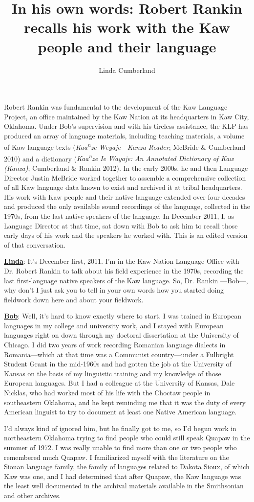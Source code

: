 \documentclass[output=paper]{LSP/langsci}
\author{Linda Cumberland}
\title{In his own words: Robert Rankin recalls his work with the Kaw people and their language}
\begin{document}
Robert Rankin was fundamental to the development of the Kaw Language Project, an office maintained by the Kaw Nation at its headquarters in Kaw City, Oklahoma. Under Bob's supervision and with his tireless assistance, the KLP has produced an array of language materials, including teaching materials, a volume of Kaw language texts (\textit{Kaa\textsuperscript{n}ze Weyaje}---\textit{Kanza Reader}; McBride \& Cumberland 2010) and a dictionary (\textit{Kaa\textsuperscript{n}ze Ie Wayaje: An Annotated Dictionary of Kaw (Kanza)}; Cumberland \& Rankin 2012). In the early 2000s, he and then Language Director Justin McBride worked together to assemble a comprehensive collection of all Kaw language data known to exist and archived it at tribal headquarters. His work with Kaw people and their native language extended over four decades and produced the only available sound recordings of the language, collected in the 1970s, from the last native speakers of the language. In December 2011, I, as Language Director at that time, sat down with Bob to ask him to recall those early days of his work and the speakers he worked with. This is an edited version of that conversation.

\textbf{\underline{Linda}}: It's December first, 2011. I'm in the Kaw Nation Language Office with Dr. Robert Rankin to talk about his field experience in the 1970s, recording the last first-language native speakers of the Kaw language. So, Dr. Rankin ---Bob---, why don't I just ask you to tell in your own words how you started doing fieldwork down here and about your fieldwork.

\textbf{\underline{Bob}}:  Well, it's hard to know exactly where to start. I was trained in European languages in my college and university work, and I stayed with European languages right on down through my doctoral dissertation at the University of Chicago. I did two years of work recording Romanian language dialects in Romania---which at that time was a Communist country---under a Fulbright Student Grant in the mid-1960s and had gotten the job at the University of Kansas on the basis of my linguistic training and my knowledge of those European languages. But I had a colleague at the University of Kansas, Dale Nicklas, who had worked most of his life with the Choctaw people in southeastern Oklahoma, and he kept reminding me that it was the duty of every American linguist to try to document at least one Native American language. 

I'd always kind of ignored him, but he finally got to me, so I'd begun work in northeastern Oklahoma trying to find people who could still speak Quapaw in the summer of 1972. I was really unable to find more than one or two people who remembered much Quapaw. I familiarized myself with the literature on the Siouan language family, the family of languages related to Dakota Sioux, of which Kaw was one, and I had determined that after Quapaw, the Kaw language was the least well documented in the archival materials available in the Smithsonian and other archives. 
\end{document}
